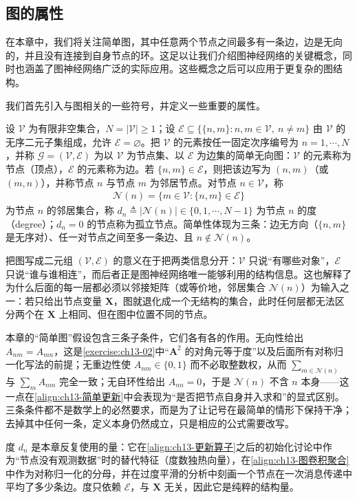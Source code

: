 \documentclass[../../main.tex]{subfiles}
\begin{document}
\subsection{图的属性}\label{subsection:ch13-图的属性}

在本章中，我们将关注简单图，其中任意两个节点之间最多有一条边，边是无向的，并且没有连接到自身节点的环。这足以让我们介绍图神经网络的关键概念，同时也涵盖了图神经网络广泛的实际应用。这些概念之后可以应用于更复杂的图结构。

我们首先引入与图相关的一些符号，并定义一些重要的属性。

\begin{definition}[图、邻居与度]\label{definition:ch13-图}
设 $\mathcal{V}$ 为有限非空集合，$N=|\mathcal{V}|\geqslant1$；设 $\mathcal{E}\subseteq\{\{n,m\}:n,m\in\mathcal{V},\ n\neq m\}$ 由 $\mathcal{V}$ 的无序二元子集组成，允许 $\mathcal{E}=\varnothing$。把 $\mathcal{V}$ 的元素按任一固定次序编号为 $n=1,\cdots,N$，并称 $\mathcal{G}=(\mathcal{V},\mathcal{E})$ 为以 $\mathcal{V}$ 为节点集、以 $\mathcal{E}$ 为边集的简单无向图：$\mathcal{V}$ 的元素称为节点（顶点），$\mathcal{E}$ 的元素称为边。若 $\{n,m\}\in\mathcal{E}$，则把该边写为 $(n,m)$（或 $(m,n)$），并称节点 $n$ 与节点 $m$ 为邻居节点。对节点 $n\in\mathcal{V}$，称
\begin{align*}
\mathcal{N}(n)=\{m\in\mathcal{V}:\{n,m\}\in\mathcal{E}\}
\end{align*}
为节点 $n$ 的邻居集合，称 $d_n\triangleq|\mathcal{N}(n)|\in\{0,1,\cdots,N-1\}$ 为节点 $n$ 的度（degree）；$d_n=0$ 的节点称为孤立节点。简单性体现为三条：边无方向（$\{n,m\}$ 是无序对）、任一对节点之间至多一条边、且 $n\notin\mathcal{N}(n)$。
\end{definition}

\begin{remark}
把图写成二元组 $(\mathcal{V},\mathcal{E})$ 的意义在于把两类信息分开：$\mathcal{V}$ 只说“有哪些对象”，$\mathcal{E}$ 只说“谁与谁相连”，而后者正是图神经网络唯一能够利用的结构信息。这也解释了为什么后面的每一层都必须以邻接矩阵（或等价地，邻居集合 $\mathcal{N}(n)$）为输入之一：若只给出节点变量 $\bm{X}$，图就退化成一个无结构的集合，此时任何层都无法区分两个在 $\bm{X}$ 上相同、但在图中位置不同的节点。\par
本章的“简单图”假设包含三条子条件，它们各有各的作用。无向性给出 $A_{nm}=A_{mn}$，这是\cref{exercise:ch13-02}中“$\bm{A}^2$ 的对角元等于度”以及后面所有对称归一化写法的前提；无重边性使 $A_{nm}\in\{0,1\}$ 而不必取整数权，从而 $\sum_{m\in\mathcal{N}(n)}$ 与 $\sum_{m}A_{nm}$ 完全一致；无自环性给出 $A_{nn}=0$，于是 $\mathcal{N}(n)$ 不含 $n$ 本身——这一点在\eqref{align:ch13-简单更新}中会表现为“是否把节点自身并入求和”的显式区别。三条条件都不是数学上的必然要求，而是为了让记号在最简单的情形下保持干净；去掉其中任何一条，定义本身仍然成立，只是相应的公式需要改写。\par
度 $d_n$ 是本章反复使用的量：它在\eqref{align:ch13-更新算子}之后的初始化讨论中作为“节点没有观测数据”时的替代特征（度数独热向量），在\eqref{align:ch13-图卷积聚合}中作为对称归一化的分母，并在过度平滑的分析中刻画一个节点在一次消息传递中平均了多少条边。度只依赖 $\mathcal{E}$，与 $\bm{X}$ 无关，因此它是纯粹的结构量。
\end{remark}
\end{document}
